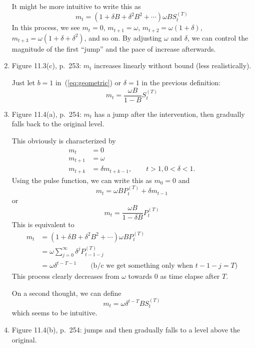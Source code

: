 \documentclass[12pt]{article}
\begin{document}
\begin{enumerate}
    It might be more intuitive to write this as
    \[
        m_t = (1 + \delta B + \delta^2 B^2 +\dotsb) \omega B S_{t}^{(T)}
    \]
    In this process, we see
    $m_t = 0$,
    $m_{t+1} = \omega$,
    $m_{t+2} = \omega (1 + \delta)$,
    $m_{t+3} = \omega (1 + \delta + \delta^2)$,
    and so on.
    By adjusting $\omega$ and $\delta$,
    we can control the magnitude of the first ``jump''
    and the pace of increase afterwards.

\item Figure 11.3(c), p.~253: $m_t$ increases linearly without bound
(less realistically).

    Just let $b=1$ in~(\ref{eq:geometric}) or $\delta = 1$ in the
    previous definition:
    \[
        m_t = \frac{\omega B}{1 - B} S_t^{(T)}
    \]

\item Figure 11.4(a), p.~254: $m_t$ has a jump after the
intervention, then gradually falls back to the original level.

    This obviously is characterized by
    \begin{align*}
        m_{t} &= 0\\
        m_{t+1} &= \omega\\
        m_{t+k} &= \delta m_{t+k-1},\qquad t>1, 0<\delta<1.
    \end{align*}
    Using the pulse function,
    we can write this as $m_0 = 0$ and
    \[
        m_t = \omega BP_{t}^{(T)} + \delta m_{t-1}
    \]
    or
    \begin{equation}\label{eq:decrease-1}
        m_t = \frac{\omega B}{1 - \delta B} P_t^{(T)}
    \end{equation}
    This is equivalent to
    \begin{align*}
        m_t &= (1 + \delta B + \delta^2 B^2 +\dotsb) \omega B
                P_t^{(T)}\\
            &= \omega \sum_{j=0}^\infty \delta^j P_{t-1-j}^{(T)}\\
            &= \omega \delta^{t-T-1}
                \qquad \text{(b/c we get something only when $t-1-j = T$)}
    \end{align*}
    This process clearly decreases from $\omega$ towards 0 as time
    elapse after $T$.

    On a second thought, we can define
    \[
        m_t = \omega \delta^{t-T} B S_t^{(T)}
    \]
    which seems to be intuitive.

\item Figure 11.4(b), p.~254: jumps and then gradually falls to a level
    above the original.


\end{enumerate}
\end{document}
